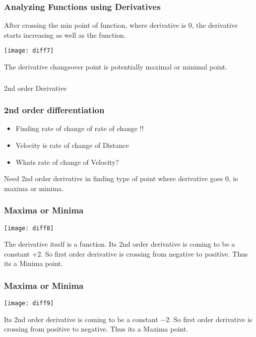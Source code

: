  \begin{frame}[fragile] \frametitle{Analyzing Functions using Derivatives}
After crossing the min point of function, where derivative is 0, the derivative starts increasing as well as the function.
\begin{center}
\texttt{[image: diff7]}
\end{center}
The derivative changeover point is potentially maximal or minimal point.
\end{frame}

\begin{frame}[fragile]\frametitle{}
\begin{center}
{\Large 2nd order Derivative}
\end{center}
\end{frame}



 \begin{frame}[fragile] \frametitle{2nd order differentiation}

\begin{itemize}
	\item Finding rate of change of rate of change !!
	\item Velocity is rate of change of Distance
	\item Whats rate of change of Velocity?
	
\end{itemize}
Need 2nd order derivative in finding type of point where derivative goes 0, ie maxima or minima.

\end{frame}

 \begin{frame}[fragile] \frametitle{Maxima or Minima}

\begin{center}
\texttt{[image: diff8]}
\end{center}

The derivative itself is a function. Its 2nd order derivative is coming to be a constant $+2$. 
So first order derivative is crossing from negative to positive. Thus its a Minima point.
\end{frame}

 \begin{frame}[fragile] \frametitle{Maxima or Minima}

\begin{center}
\texttt{[image: diff9]}
\end{center}

Its 2nd order derivative is coming to be a constant $-2$. 
So first order derivative is crossing from positive to negative. Thus its a Maxima point.
\end{frame}


